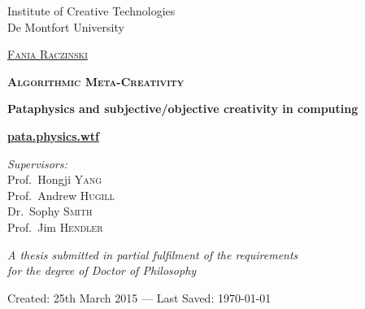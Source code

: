 
\begin{titlingpage}
\begin{center}

Institute of Creative Technologies\\
De Montfort University

\vspace{2cm}

\textsc{\huge \href{http://fania.uk}{Fania Raczinski}}

\vspace{2cm}


\textsc{\Huge \bfseries Algorithmic Meta-Creativity}

\vspace{1.5cm}

{\huge \bfseries Pataphysics and subjective/objective creativity in computing}


\vspace{1cm}
{\Huge \textbf{\url{pata.physics.wtf}}}
\vspace{2cm}

\emph{Supervisors:}\\
{Prof.\ Hongji \textsc{Yang}}\\
{Prof.\ Andrew \textsc{Hugill}}\\
{Dr.\ Sophy \textsc{Smith}}\\
{Prof.\ Jim \textsc{Hendler}}

\vspace{1.5cm}

\large \textit{A thesis submitted in partial fulfilment of the requirements\\ for the degree of Doctor of Philosophy}

\vfill

Created: {25th March 2015} --- Last Saved: {\today}\\

\end{center}
\end{titlingpage}
